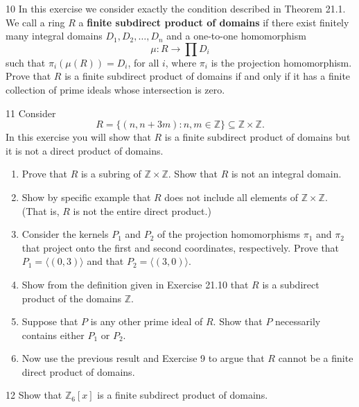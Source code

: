 \begin{problem}{10}
    In this exercise we consider exactly the condition described in Theorem 21.1. We call
    a ring $R$ a \textbf{finite subdirect product of domains} if there exist finitely many
    integral domains $D_1, D_2, \ldots, D_n$ and a one-to-one homomorphism
    \[\mu : R \to \prod D_i\]
    such that $\pi_i(\mu(R)) = D_i$, for all $i$, where $\pi_i$ is the projection
    homomorphism. Prove that $R$ is a finite subdirect product of domains if and only if
    it has a finite collection of prime ideals whose intersection is zero.
\end{problem}
\unsolved

\begin{problem}{11}
    Consider
    \[R = \{(n, n + 3m) : n, m \in \mathbb{Z}\} \subseteq \mathbb{Z} \times \mathbb{Z}.\]
    In this exercise you will show that $R$ is a finite subdirect product of domains but
    it is not a direct product of domains.
    \begin{enumerate}
        \item[(a)] Prove that $R$ is a subring of $\mathbb{Z} \times \mathbb{Z}$. Show that
        $R$ is not an integral domain.
        \item[(b)] Show by specific example that $R$ does not include all elements of
        $\mathbb{Z} \times \mathbb{Z}$. (That is, $R$ is not the entire direct product.)
        \item[(c)] Consider the kernels $P_1$ and $P_2$ of the projection homomorphisms
        $\pi_1$ and $\pi_2$ that project onto the first and second coordinates,
        respectively. Prove that $P_1 = \langle (0, 3) \rangle$ and that
        $P_2 = \langle (3, 0) \rangle$.
        \item[(d)] Show from the definition given in Exercise 21.10 that $R$ is a
        subdirect product of the domains $\mathbb{Z}$.
        \item[(e)] Suppose that $P$ is any other prime ideal of $R$. Show that $P$
        necessarily contains either $P_1$ or $P_2$.
        \item[(f)] Now use the previous result and Exercise 9 to argue that $R$ cannot be a
        finite direct product of domains.
    \end{enumerate}
\end{problem}
\unsolved

\begin{problem}{12}
    Show that $\mathbb{Z}_6[x]$ is a finite subdirect product of domains.
\end{problem}
\unsolved

